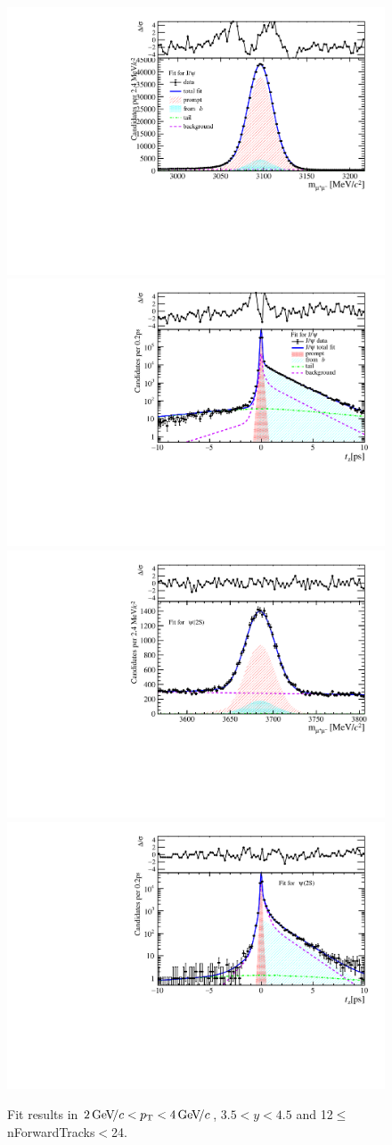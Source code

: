 \begin{figure}[H]
\begin{center}
\includegraphics[width=0.47\linewidth]{pdf/Jpsi/drawmassF/n2y3pt2.pdf}
\includegraphics[width=0.47\linewidth]{pdf/Jpsi/2DFitF/n2y3pt2.pdf}
\vspace*{-0.5cm}
\includegraphics[width=0.47\linewidth]{pdf/Psi2S/drawmassF/n2y3pt2.pdf}
\includegraphics[width=0.47\linewidth]{pdf/Psi2S/2DFitF/n2y3pt2.pdf}
\vspace*{-0.5cm}
\end{center}
\caption{Fit results in $2\text{\,Ge\kern -0.1em V\!/}c<p_{\mathrm{T}}<4\text{\,Ge\kern -0.1em V\!/}c$, $3.5<y<4.5$ and 12$\leq$nForwardTracks$<$24.}
\label{Fitn2y3pt2}
\end{figure}
